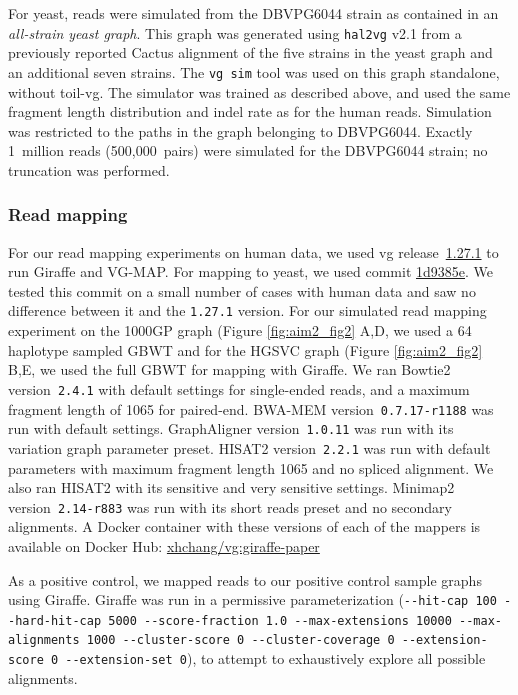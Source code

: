 \documentclass[11pt]{ucscthesis}
\newcommand{\vgcommit}[2]{\href{https://github.com/vgteam/vg/commit/#1}{#2}}
\newcommand{\vocab}[1]{\emph{#1}}
\begin{document}
For yeast, reads were simulated from the DBVPG6044 strain as contained in an \vocab{all-strain yeast graph}. 
This graph was generated using \texttt{hal2vg} v2.1 from a previously reported Cactus alignment of the five strains in the yeast graph and an additional seven strains\cite{hickey_vgsv_2020}.
The \texttt{vg~sim} tool was used on this graph standalone, without toil-vg.
The simulator was trained as described above, and used the same fragment length distribution and indel rate as for the human reads.
Simulation was restricted to the paths in the graph belonging to DBVPG6044.
Exactly 1~million reads (500,000~pairs) were simulated for the DBVPG6044 strain; no truncation was performed.


\subsubsection{Read mapping}
\label{subsec:readmapping}
For our read mapping experiments on human data, we used vg release~\vgcommit{6b7d2eeb618bb85c65438016a9eeccecfa0f6c82}{1.27.1} to run Giraffe and VG-MAP.
For mapping to yeast, we used commit \vgcommit{1d9385e1ca55689cd3ad251b6b2c23319d37be52}{1d9385e}.
We tested this commit on a small number of cases with human data and saw no difference between it and the \texttt{1.27.1} version.
For our simulated read mapping experiment on the 1000GP graph (Figure \ref{fig:aim2_fig2} A,D, we used a 64 haplotype sampled GBWT and for the HGSVC graph (Figure \ref{fig:aim2_fig2} B,E, we used the full GBWT for mapping with Giraffe.
We ran Bowtie2 version~\texttt{2.4.1} with default settings for single-ended reads, and a maximum fragment length of 1065 for paired-end.
BWA-MEM version~\texttt{0.7.17-r1188} was run with default settings.
GraphAligner version~\texttt{1.0.11} was run with its variation graph parameter preset.
HISAT2 version~\texttt{2.2.1} was run with default parameters with maximum fragment length 1065 and no spliced alignment.
We also ran HISAT2 with its sensitive and very sensitive settings.
Minimap2 version~\texttt{2.14-r883} was run with its short reads preset and no secondary alignments.
A Docker container with these versions of each of the mappers is available on Docker Hub: \href{https://hub.docker.com/layers/xhchang/vg/giraffe-paper/images/sha256-7dd5579b6cd3805c7d335803f2f646eada09f32159d1c534ab6c91c402627e33?context=explore}{xhchang/vg:giraffe-paper}

As a positive control, we mapped reads to our positive control sample graphs using Giraffe.
Giraffe was run in a permissive parameterization (\texttt{-{}-hit-cap 100 -{}-hard-hit-cap 5000 -{}-score-fraction 1.0 -{}-max-extensions 10000 -{}-max-alignments 1000 -{}-cluster-score 0 -{}-cluster-coverage 0 -{}-extension-score 0 -{}-extension-set 0}), to attempt to exhaustively explore all possible alignments.
\end{document}
